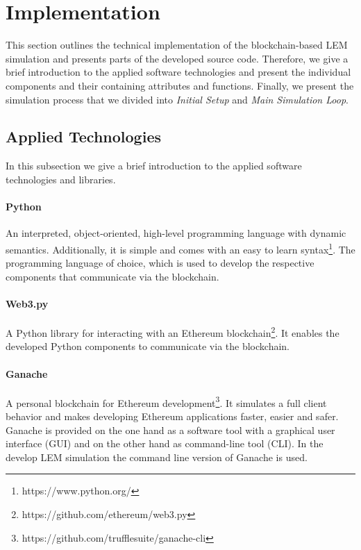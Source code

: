 \section{Implementation}
\label{sec:implementation}

This section outlines the technical implementation of the blockchain-based LEM simulation
and presents parts of the developed source code. Therefore, we give a brief introduction to the applied 
software technologies and present the individual components and their containing attributes and functions.
Finally, we present the simulation process that we divided into \textit{Initial Setup} and \textit{Main Simulation Loop}. 

\subsection{Applied Technologies}
\label{sec:applied_technologies}
In this subsection we give a brief introduction 
to the applied software technologies and libraries.

\paragraph{Python}
An interpreted, object-oriented, high-level programming language with dynamic semantics. 
Additionally, it is simple and comes with an easy to learn syntax\footnote{https://www.python.org/}.
The programming language of choice, which is used to develop the 
respective components that communicate via the blockchain.

\paragraph{Web3.py}
A Python library for interacting with an Ethereum blockchain\footnote{https://github.com/ethereum/web3.py}. 
It enables the developed Python components to communicate via the blockchain.

\paragraph{Ganache}
A personal blockchain for Ethereum development\footnote{https://github.com/trufflesuite/ganache-cli}.
It simulates a full client behavior and makes developing Ethereum applications faster, easier and safer.
Ganache is provided on the one hand as a software tool with a graphical user interface (GUI) and on the other hand as command-line tool (CLI). In the develop LEM simulation the command line version of Ganache is used. 

